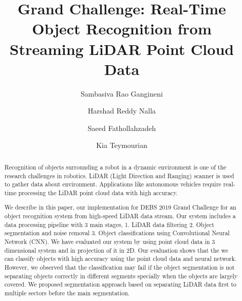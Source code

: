 \documentclass[sigconf]{acmart}
\begin{document}
%

\title{Grand Challenge: Real-Time Object Recognition from Streaming LiDAR Point Cloud Data}


%


\author{Sambasiva Rao Gangineni}

\author{Harshad Reddy Nalla}


\author{Saeed Fathollahzadeh}

\author{Kia Teymourian}



%
\renewcommand{\shortauthors}{Gangineni, et al.}

%
\begin{abstract}
Recognition of objects surrounding a robot in a dynamic environment is one of the research challenges in robotics.
LiDAR (Light Direction and Ranging) scanner is used to gather data about environment.  
Applications like autonomous vehicles require real-time processing the LiDAR point cloud data with high accuracy.   

We describe in this paper, our implementation for DEBS 2019 Grand Challenge for an object recognition system from high-speed 
LiDAR data stream. Our system includes a data processing pipeline with 3 main stages, 1. LiDAR data filtering 2. Object segmentation and noise removal 3. Object classifications using Convolutional Neural Network (CNN). We have evaluated our system by using point cloud data in 3 dimensional system and in projection of it in 2D. Our evaluation shows that the we can classify objects with high accuracy using the point cloud data and neural network. However, we observed that the classification may fail if the object segmentation is not separating objects correctly in different segments specially when the objects are largely covered. We proposed segmentation approach based on separating LiDAR data first to multiple sectors before the main segmentation.     
\end{abstract}
\end{document}

